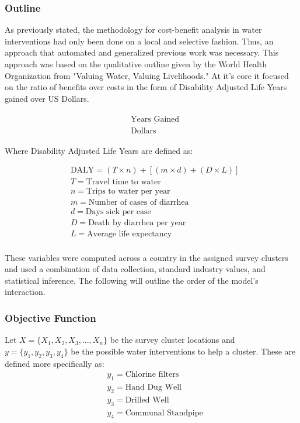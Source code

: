

\subsubsection*{Outline}
As previously stated, the methodology for cost-benefit analysis in water interventions had only been done on a local and selective fashion.
Thus, an approach that automated and generalized previous work was necessary.
This approach was based on the qualitative outline given by the World Health Organization from "Valuing Water, Valuing Livelihoods."
At it's core it focused on the ratio of benefits over costs in the form of Disability Adjusted Life Years gained over US Dollars.

\begin{equation}
\begin{aligned}
& \begin{matrix} \underline{\text{Years Gained}} \\ \text{Dollars} \end{matrix}
\end{aligned}
\end{equation}

Where Disability Adjusted Life Years are defined as:

\begin{equation}
\begin{aligned}
& \text{DALY} = (T \times n) + [(m \times d) + (D \times L)]\\
& T = \text{Travel time to water}\\
& n = \text{Trips to water per year}\\
& m = \text{Number of cases of diarrhea}\\
& d = \text{Days sick per case}\\
& D = \text{Death by diarrhea per year}\\
& L = \text{Average life expectancy}\\
\end{aligned}
\end{equation}

These variables were computed across a country in the assigned survey clusters and used a combination of data collection, standard industry values, and statistical inference.
The following will outline the order of the model's interaction.

\subsubsection*{Objective Function}
Let $X = \{X_1,X_2,X_3,...,X_n\}$ be the survey cluster locations and $y = \{y_1,y_2,y_3,y_4\}$ be the possible water interventions to help a cluster.
These are defined more specifically as:
\begin{equation}
\begin{aligned} 
& y_1 = \text{Chlorine filters}\\
& y_2 = \text{Hand Dug Well}\\
& y_3 = \text{Drilled Well}\\
& y_4 = \text{Communal Standpipe}\\
\end{aligned}
\end{equation}

